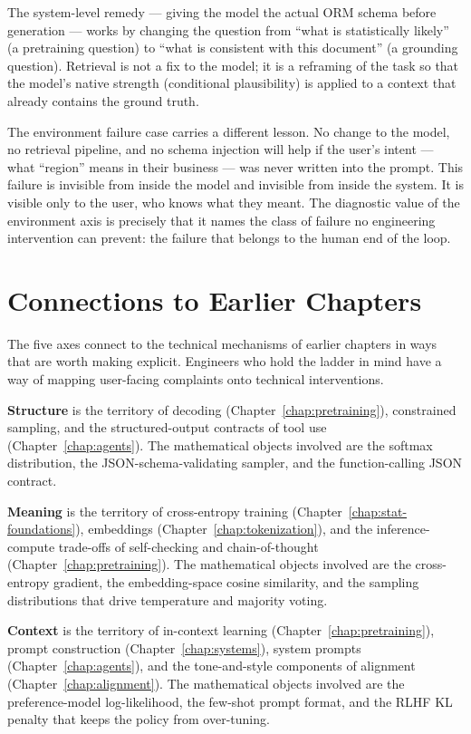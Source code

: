 The system-level remedy --- giving the model the actual ORM schema
before generation --- works by changing the question from ``what is
statistically likely'' (a pretraining question) to ``what is
consistent with this document'' (a grounding question). Retrieval
is not a fix to the model; it is a reframing of the task so that
the model's native strength (conditional plausibility) is applied
to a context that already contains the ground truth.

The environment failure case carries a different lesson. No change
to the model, no retrieval pipeline, and no schema injection will
help if the user's intent --- what ``region'' means in their
business --- was never written into the prompt. This failure is
invisible from inside the model and invisible from inside the
system. It is visible only to the user, who knows what they meant.
The diagnostic value of the environment axis is precisely that it
names the class of failure no engineering intervention can prevent:
the failure that belongs to the human end of the loop.

\section{Connections to Earlier Chapters}

The five axes connect to the technical mechanisms of earlier
chapters in ways that are worth making explicit. Engineers who
hold the ladder in mind have a way of mapping user-facing
complaints onto technical interventions.

\textbf{Structure} is the territory of decoding (Chapter~\ref{chap:pretraining}),
constrained sampling, and the structured-output contracts of tool
use (Chapter~\ref{chap:agents}). The mathematical objects involved are the
softmax distribution, the JSON-schema-validating sampler, and the
function-calling JSON contract.

\textbf{Meaning} is the territory of cross-entropy training
(Chapter~\ref{chap:stat-foundations}), embeddings (Chapter~\ref{chap:tokenization}), and the inference-compute
trade-offs of self-checking and chain-of-thought (Chapter~\ref{chap:pretraining}). The
mathematical objects involved are the cross-entropy gradient, the
embedding-space cosine similarity, and the sampling distributions
that drive temperature and majority voting.

\textbf{Context} is the territory of in-context learning
(Chapter~\ref{chap:pretraining}), prompt construction (Chapter~\ref{chap:systems}), system prompts
(Chapter~\ref{chap:agents}), and the tone-and-style components of alignment
(Chapter~\ref{chap:alignment}). The mathematical objects involved are the
preference-model log-likelihood, the few-shot prompt format, and
the RLHF KL penalty that keeps the policy from over-tuning.

